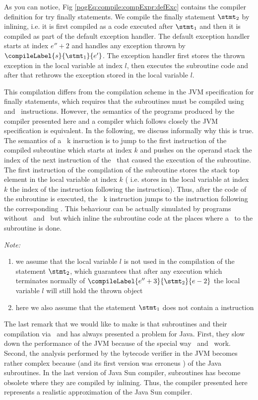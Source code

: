 As you can notice, Fig \ref{pogEq:compile:compExpr:defExc} contains the compiler definition for try finally statements. 
We compile the finally statement $ \stmt_2 $ by inlining, i.e. it is first compiled as a code executed after $\stmt_1$  and
then it is compiled as part of the default exception handler. The default exception handler starts at index $e'' + 2 $ and 
  handles any exception thrown by $\compileLabel{s}{\stmt_1}{e'}$. The exception handler 
first stores the thrown exception in the local variable at index $l$, then executes the subroutine code and after that rethrows the exception 
stored in the local variable $l$. 

This compilation differs from the compilation scheme in the JVM specification for finally statements, 
which requires that the subroutines must be compiled using  and 
\ret \ instructions. However, the semantics of the programs produced by the compiler presented here and a compiler which follows closely the JVM specification 
is equivalent. 
In the following, we discuss informally why this is true.
 The semantics of a \jsr \ k insruction is to  jump to the first instruction of the compiled subroutine which starts at index $k$ and pushes on the
 operand stack the index of the next instruction of the \jsr \ that caused the execution of the subroutine. 
The first instruction of the compilation
of the subroutine stores the stack top element in the local variable at index $k$ ( i.e. stores in the local variable at index $k$ the index of the instruction following the  instruction). Thus, after the code of the subroutine is 
executed, the \ret \ k instruction jumps to 
 the instruction following the corresponding \jsr. This behaviour can be actually simulated by programs without \jsr \ and \ret \ but which inline the subroutine code
at the places where a \jsr \ to the subroutine is done.

\textit{Note:}
 \begin{enumerate}
           \item we assume that the local variable $l$ is not used in the compilation of the statement $\stmt_2$, which guarantees that after any execution which 
	   terminates normally of $\compileLabel{e'' + 3}{\stmt_2}{e - 2}$ the local variable  $l$ will still hold the thrown object
           \item here we also assume that the statement $\stmt_1$ does not contain a  instruction 
\end{enumerate}

The  last remark that we would like to make is that subroutines and their compilation via \ret \ and \jsr has always presented a problem for Java.
First, they slow down the performance of the JVM  because of the special way \ret \ and \jsr \ work.
Second, the analysis performed by the  bytecode verifier in  the JVM becomes rather complex because  (and its first version was erroneus ) 
of the Java subroutines. In the last version of Java Sun compiler, subroutines has become obsolete 
 where they are compiled by inlining. Thus, the compiler presented here represents a realistic approximation of the Java Sun compiler.


